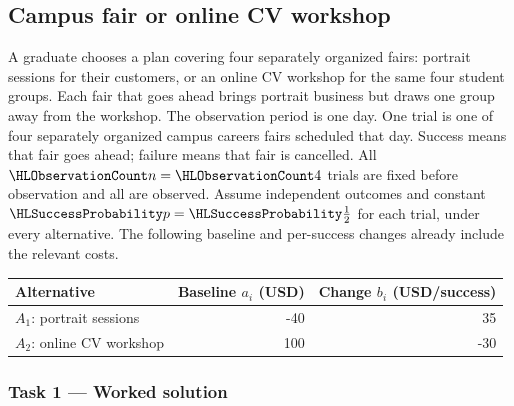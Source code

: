 \subsection{Campus fair or online CV workshop}\label{prob:c4-coffee}
A graduate chooses a plan covering four separately organized fairs: portrait sessions for their customers, or an online CV workshop for the same four student groups. Each fair that goes ahead brings portrait business but draws one group away from the workshop.
The observation period is one day. One trial is one of four separately organized campus careers fairs scheduled that day.
Success means that fair goes ahead; failure means that fair is cancelled.
All $\TrialCount{n}=\TrialCount{4}$ trials are fixed before observation and all are observed.
Assume independent outcomes and constant $\SuccessProb{p}=\SuccessProb{\frac{1}{2}}$ for each trial, under every alternative.
The following baseline and per-success changes already include the relevant costs.
\begin{center}\begin{tabular}{lrr}\toprule Alternative & Baseline $a_i$ (USD) & Change $b_i$ (USD/success)\\\midrule
$A_1$: portrait sessions & -40 & 35\\
$A_2$: online CV workshop & 100 & -30\\
\bottomrule\end{tabular}\end{center}
\subsubsection*{Task 1 --- Worked solution}\label{sol:c4-coffee-model}

